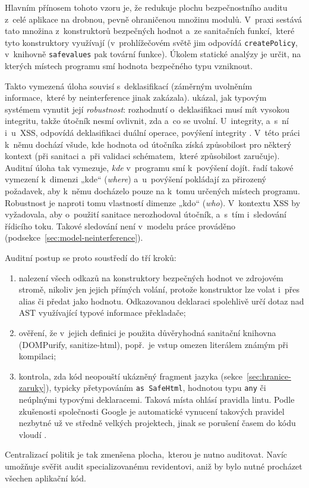 Hlavním přínosem tohoto vzoru je, že redukuje plochu bezpečnostního auditu z~celé aplikace na drobnou, pevně ohraničenou množinu modulů. V~praxi sestává tato množina z~konstruktorů bezpečných hodnot a~ze sanitačních funkcí,~které tyto konstruktory využívají (v~prohlížečovém světě jim odpovídá \texttt{createPolicy}, v~knihovně \texttt{safevalues} pak tovární funkce). Úkolem statické analýzy je určit, na kterých místech programu smí hodnota bezpečného typu vzniknout.

Takto vymezená úloha souvisí s~deklasifikací (záměrným uvolněním informace,~které by neinterference jinak zakázala). \textcite{zdancewic2003robust} ukázal, jak typovým systémem vynutit její \emph{robustnost}: rozhodnutí o~deklasifikaci musí mít vysokou integritu, takže útočník nesmí ovlivnit, zda a~co se uvolní. U~integrity, a~s~ní i~u~XSS, odpovídá deklasifikaci duální operace, povýšení integrity \parencite{zdancewic2003robust}. V~této práci k~němu dochází všude, kde hodnota od útočníka získá způsobilost pro některý kontext (při sanitaci a~při validaci schématem,~které způsobilost zaručuje). Auditní úloha tak vymezuje, \emph{kde} v~programu smí k~povýšení dojít. \textcite{sabelfeld2009declassification} řadí takové vymezení k~dimenzi „kde“ (\emph{where}) a~u~povýšení pokládají za přirozený požadavek, aby k~němu docházelo pouze na k~tomu určených místech programu. Robustnost je naproti tomu vlastností dimenze „kdo“ (\emph{who}). V~kontextu XSS by vyžadovala, aby o~použití sanitace nerozhodoval útočník, a~s~tím i~sledování řídicího toku. Takové sledování není v~modelu práce prováděno (podsekce~\ref{sec:model-neinterference}).

Auditní postup se proto soustředí do tří kroků:
\begin{enumerate}
    \item nalezení všech odkazů na konstruktory bezpečných hodnot ve zdrojovém stromě, nikoliv jen jejich přímých volání, protože konstruktor lze volat i~přes alias či předat jako hodnotu. Odkazovanou deklaraci spolehlivě určí dotaz nad AST využívající typové informace překladače;
    \item ověření, že v~jejich definici je použita důvěryhodná sanitační knihovna (DOMPurify, sanitize-html), popř.~je vstup omezen literálem známým při kompilaci;
    \item kontrola, zda kód neopouští ukázněný fragment jazyka (sekce~\ref{sec:hranice-zaruky}), typicky přetypováním \texttt{as SafeHtml}, hodnotou typu \texttt{any} či neúplnými typovými deklaracemi. Taková místa ohlásí pravidla lintu. Podle zkušenosti společnosti Google je automatické vynucení takových pravidel nezbytné už ve středně velkých projektech, jinak se porušení časem do kódu vloudí \parencite{kern2014tangled}.
\end{enumerate}
Centralizací politik je tak zmenšena plocha,~kterou je nutno auditovat. Navíc umožňuje svěřit audit specializovanému revidentovi, aniž by bylo nutné procházet všechen aplikační kód.

